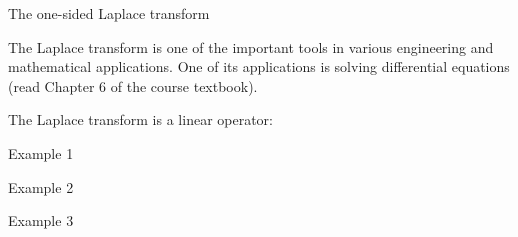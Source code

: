 \EMhold


\begin{EMdefinition}{The one-sided Laplace transform}


\end{EMdefinition}

The Laplace transform is one of the important tools in various engineering and mathematical applications. One of its applications is solving differential equations (read Chapter 6 of the course textbook).

The Laplace transform is a linear operator:

\begin{EMexample}{Example 1}



\end{EMexample}

\begin{EMexample}{Example 2}



\end{EMexample}

\begin{EMexample}{Example 3}


\end{EMexample}

